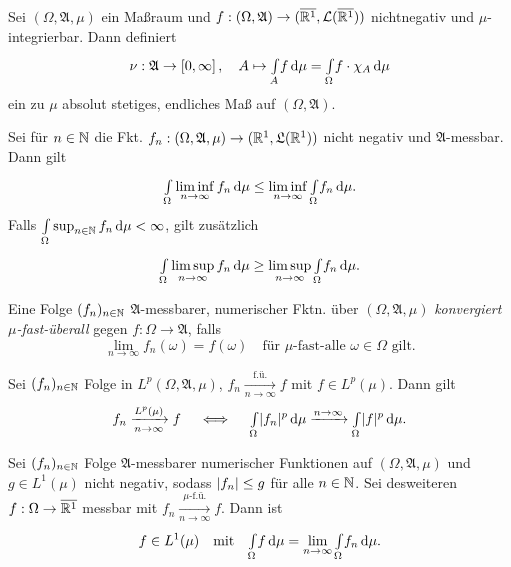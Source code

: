 \documentclass{cheat-sheet}
\newcommand{\Alg}{\mathfrak{A}} %
\newcommand{\LebAlg}{\mathfrak{L}} %
\newcommand{\Leb}{\mathcal{L}} %
\renewcommand{\ER}{\overline{\R^1}} %
\newcommand{\IntOmu}[1]{\Int{\Omega}{}{#1}{\mu}} %
\begin{document}
\begin{satz}
  Sei $(\Omega, \Alg, \mu)$ ein Maßraum und $f : (\Omega, \Alg) \to (\ER, \Leb(\ER))$ nichtnegativ und $\mu$-integrierbar. Dann definiert
  \[ \nu : \Alg \to \left[0, \infty \right], \quad A \mapsto \Int{A}{}{f}{\mu} = \IntOmu{f \cdot \chi_A} \]
  ein zu $\mu$ absolut stetiges, endliches Maß auf $(\Omega, \Alg)$.
\end{satz}

\begin{lem}[Fatou]
  Sei für $n \in \mathbb{N}$ die Fkt. $f_n : (\Omega, \Alg, \mu) \to (\R^1, \LebAlg(\R^1))$ nicht negativ und $\Alg$-messbar. Dann gilt
  \[ \IntOmu{\liminf_{n \to \infty} f_n} \leq \liminf_{n \to \infty} \IntOmu{f_n}. \]
  Falls $\IntOmu{\sup_{n \in \N} f_n} < \infty$, gilt zusätzlich
  \[ \IntOmu{\limsup_{n \to \infty} f_n} \geq \limsup_{n \to \infty} \IntOmu{f_n}. \]
\end{lem}




\begin{defn}
  Eine Folge $(f_n)_{n \in \mathbb{N}}$ $\Alg$-messbarer, numerischer Fktn. über $(\Omega, \Alg, \mu)$ \emph{konvergiert $\mu$-fast-überall} gegen $f : \Omega \to \Alg$, falls
  \[ \lim_{n \to \infty} f_n(\omega) = f(\omega) \quad \text{für $\mu$-fast-alle $\omega \in \Omega$ gilt.} \]
\end{defn}


\begin{satz}[Riesz]
  Sei $(f_n)_{n \in \mathbb{N}}$ Folge in $L^p(\Omega, \Alg, \mu)$, $f_n \xrightarrow[n \to \infty]{\text{f.ü.}} f$ mit $f \in L^p(\mu)$. Dann gilt
  \[ f_n \xrightarrow[n \to \infty]{L^p(\mu)} f \quad \iff \quad {\textstyle \int\limits_{\Omega}^{}} \lvert f_n\rvert^p \,\mathrm{d} \mu \xrightarrow{n \to \infty} {\textstyle \int\limits_{\Omega}^{}} \lvert f\rvert^p \,\mathrm{d} \mu. \]
\end{satz}


\begin{satz}
  Sei $(f_n)_{n \in \mathbb{N}}$ Folge $\Alg$-messbarer numerischer Funktionen auf $(\Omega, \Alg, \mu)$ und $g \in L^1(\mu)$ nicht negativ, sodass $\lvert f_n\rvert \leq g$ für alle $n \in \mathbb{N}$. Sei desweiteren $f : \Omega \to \ER$ messbar mit $f_n \xrightarrow[n \to \infty]{\text{$\mu$-f.ü.}} f$. Dann ist
  \[ f \in L^1(\mu) \quad \text{mit} \quad {\textstyle \int\limits_{\Omega}^{}} f \,\mathrm{d} \mu = \lim_{n \to \infty} {\textstyle \int\limits_{\Omega}^{}} f_n \,\mathrm{d} \mu. \]
\end{satz}
\end{document}
